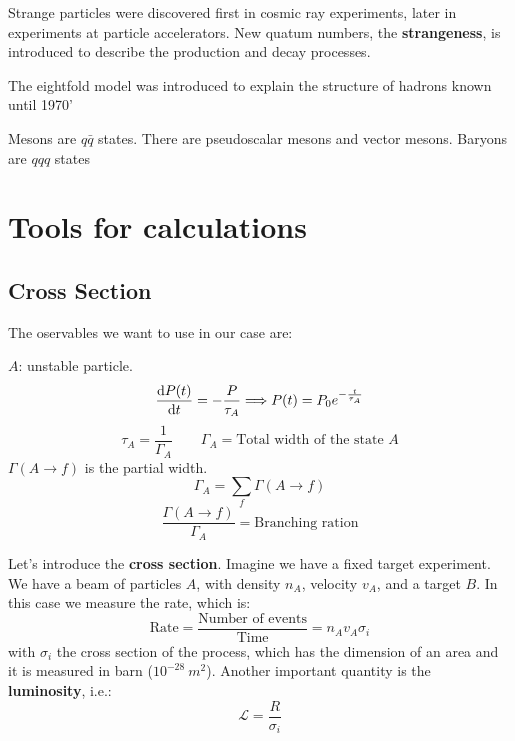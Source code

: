 \documentclass[../../main/main.tex]{subfiles}
\begin{document}
Strange particles were discovered first in cosmic ray experiments, later in experiments at particle accelerators. New quatum numbers, the \textbf{strangeness}, is introduced to describe the production and decay processes.

The eightfold model was introduced to explain the structure of hadrons known until 1970'

Mesons are \( q \bar{q} \) states. There are pseudoscalar mesons and vector mesons. Baryons are \( qqq \) states










\chapter{Tools for calculations}

\section{Cross Section}
The oservables we want to use in our case are:

\( A \): unstable particle.\\
\begin{equation}
    \dv{P(t)}{t} = - \frac{P}{\tau_A}
    \Longrightarrow
    P(t) = P_0 e^{-\frac{t}{\tau_A}}
    \label{eq:}
\end{equation}
\begin{equation}
    \tau_A = \frac{1}{\Gamma_A}
    \qquad
    \Gamma_A = \text{Total width of the state } A
    \label{eq:}
\end{equation}
\( \Gamma(A\longrightarrow f) \) is the partial width.
\begin{equation}
    \Gamma_A = \sum_{f} \Gamma(A \longrightarrow f)
    \label{eq:}
\end{equation}
\begin{equation}
    \frac{\Gamma(A \longrightarrow f)}{\Gamma_A}
    =
    \text{Branching ration}
    \label{eq:}
\end{equation}

Let's introduce the \textbf{cross section}. Imagine we have a fixed target experiment. We have a beam of particles \( A \), with density \( n_A \), velocity \( v_A \), and a target \( B \). In this case we measure the rate, which is:
\begin{equation}
    \text{Rate}
    =
    \frac{\text{Number of events}}{\text{Time}}
    =
    n_A v_A \sigma_i
    \label{eq:}
\end{equation}
with \( \sigma_i \) the cross section of the process, which has the dimension of an area and it is measured in barn (\(10^{-28} \ \si{m^2} \)). Another important quantity is the \textbf{luminosity}, i.e.:
\begin{equation}
    \mathcal{L} = \frac{R}{\sigma_i}
    \label{eq:}
\end{equation}
\end{document}
